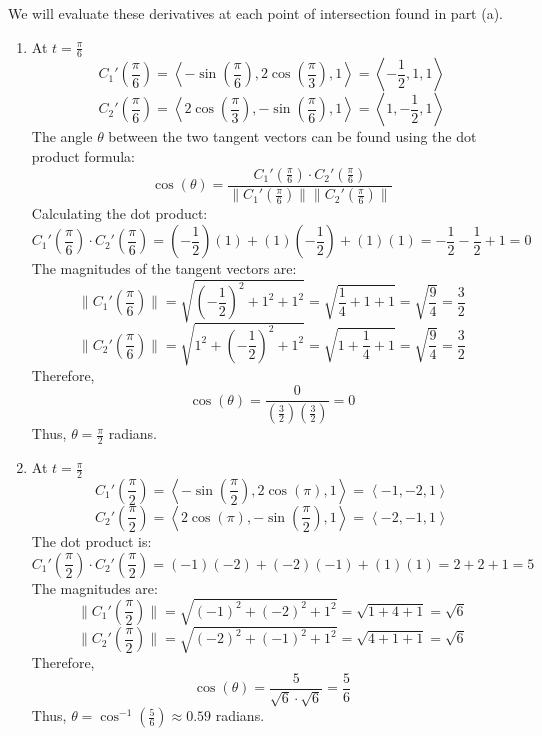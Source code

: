 \documentclass[reqno, 12pt]{amsart}
\begin{document}
\begin{itemize}
\begin{itemize}
\begin{answerbox}
          We will evaluate these derivatives at each point of intersection found in part (a).
          \begin{enumerate}
            \item At \( t = \frac{\pi}{6} \)
              \[
                C_1'\left(\frac{\pi}{6}\right) = \left\langle -\sin\left(\frac{\pi}{6}\right), 2\cos\left(\frac{\pi}{3}\right), 1 \right\rangle = \left\langle -\frac{1}{2}, 1, 1 \right\rangle
              \]
              \[
                C_2'\left(\frac{\pi}{6}\right) = \left\langle 2\cos\left(\frac{\pi}{3}\right), -\sin\left(\frac{\pi}{6}\right), 1 \right\rangle = \left\langle 1, -\frac{1}{2}, 1 \right\rangle
              \]
              The angle \( \theta \) between the two tangent vectors can be found using the dot product formula:
              \[
                \cos(\theta) = \frac{C_1'\left(\frac{\pi}{6}\right) \cdot C_2'\left(\frac{\pi}{6}\right)}{\|C_1'\left(\frac{\pi}{6}\right)\| \|C_2'\left(\frac{\pi}{6}\right)\|}
              \]
              Calculating the dot product:
              \[
                C_1'\left(\frac{\pi}{6}\right) \cdot C_2'\left(\frac{\pi}{6}\right) = \left(-\frac{1}{2}\right)(1) + (1)\left(-\frac{1}{2}\right) + (1)(1) = -\frac{1}{2} - \frac{1}{2} + 1 = 0
              \]
              The magnitudes of the tangent vectors are:
              \[
                \|C_1'\left(\frac{\pi}{6}\right)\| = \sqrt{\left(-\frac{1}{2}\right)^2 + 1^2 + 1^2} = \sqrt{\frac{1}{4} + 1 +   1} = \sqrt{\frac{9}{4}} = \frac{3}{2}
              \]
              \[
                \|C_2'\left(\frac{\pi}{6}\right)\| = \sqrt{1^2 + \left(-\frac{1}{2}\right)^2 + 1^2} = \sqrt{1 + \frac{1}{4} + 1} = \sqrt{\frac{9}{4}} = \frac{3}{2}
              \]
              Therefore,
              \[
                \cos(\theta) = \frac{0}{\left(\frac{3}{2}\right)\left(\frac{3}{2}\right)} = 0
              \]
              Thus, \( \theta = \frac{\pi}{2} \) radians.
            \item At \( t = \frac{\pi}{2} \)
              \[
                C_1'\left(\frac{\pi}{2}\right) = \left\langle -\sin\left(\frac{\pi}{2}\right), 2\cos\left(\pi\right), 1 \right\rangle = \left\langle -1, -2, 1 \right\rangle
              \]
              \[
                C_2'\left(\frac{\pi}{2}\right) = \left\langle 2\cos\left(\pi\right), -\sin\left(\frac{\pi}{2}\right), 1 \right\rangle = \left\langle -2, -1, 1 \right\rangle
              \]
              The dot product is:
              \[
                C_1'\left(\frac{\pi}{2}\right) \cdot C_2'\left(\frac{\pi}{2}\right) = (-1)(-2) + (-2)(-1) + (1)(1) = 2 + 2 + 1 = 5
              \]
              The magnitudes are:
              \[
                \|C_1'\left(\frac{\pi}{2}\right)\| = \sqrt{(-1)^2 + (-2)^2 + 1^2} = \sqrt{1 + 4 + 1} = \sqrt{6}
              \]
              \[
                \|C_2'\left(\frac{\pi}{2}\right)\| = \sqrt{(-2)^2 + (-1)^2 + 1^2} = \sqrt{4 + 1 + 1} = \sqrt{6}
              \]
              Therefore,
              \[
                \cos(\theta) = \frac{5}{\sqrt{6} \cdot \sqrt{6}} = \frac{5}{6}
              \]
              Thus, \( \theta = \cos^{-1}\left(\frac{5}{6}\right) \approx 0.59 \) radians.


\end{enumerate}
\end{answerbox}
\end{itemize}
\end{itemize}
\end{document}
